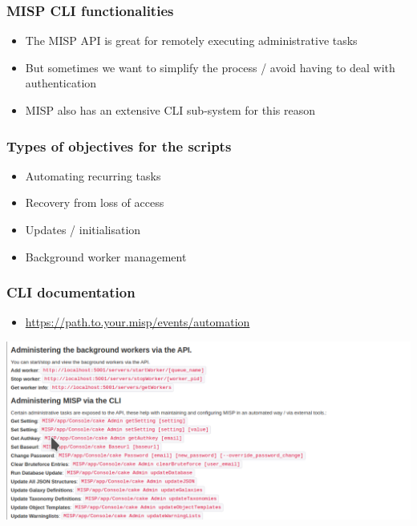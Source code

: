 
\begin{frame}[t,plain]
\titlepage
\end{frame}

\begin{frame}
\frametitle{MISP CLI functionalities}
    \begin{itemize}
        \item The MISP API is great for remotely executing administrative tasks
        \item But sometimes we want to simplify the process / avoid having to deal with authentication
        \item MISP also has an extensive CLI sub-system for this reason
    \end{itemize}
\end{frame}

\begin{frame}
\frametitle{Types of objectives for the scripts}
    \begin{itemize}
        \item Automating recurring tasks
	\item Recovery from loss of access
        \item Updates / initialisation
	\item Background worker management
    \end{itemize}
\end{frame}

\begin{frame}
  \frametitle{CLI documentation}
    \begin{itemize}
      \item \url{https://path.to.your.misp/events/automation}
    \end{itemize}
  \begin{center}
    \includegraphics[scale=0.4]{cli.png}
  \end{center}
\end{frame}

